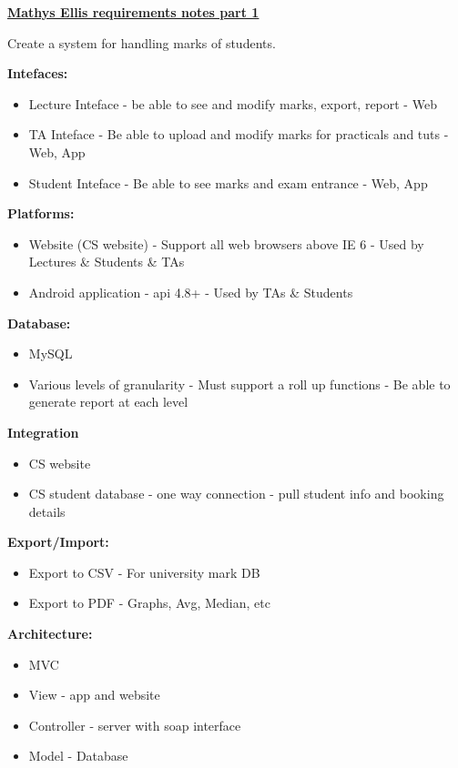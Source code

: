 \documentclass{article}
\begin{document}
\textbf{\underline{Mathys Ellis requirements notes part 1}}

Create a system for handling marks of students.

\textbf{Intefaces:}
\begin{itemize}
\item Lecture Inteface - be able to see and modify marks, export, report - Web
\item TA Inteface - Be able to upload and modify marks for practicals and tuts - Web, App
\item Student Inteface - Be able to see marks and exam entrance - Web, App
\end{itemize}

\textbf{Platforms:}
\begin{itemize}
\item Website (CS website) - Support all web browsers above IE 6 - Used by Lectures \& Students \& TAs
\item Android application - api 4.8+ - Used by TAs \& Students
\end{itemize}

\textbf{Database:}
\begin{itemize}
\item MySQL
\item Various levels of granularity - Must support a roll up functions - Be able to generate report at each level
\end{itemize}

\textbf{Integration}
\begin{itemize}
\item CS website
\item CS student database - one way connection - pull student info and booking details
\end{itemize}

\textbf{Export/Import:}
\begin{itemize}
\item Export to CSV - For university mark DB
\item Export to PDF - Graphs, Avg, Median, etc
\end{itemize}

\textbf{Architecture:}
\begin{itemize}
\item MVC
\item View - app and website
\item Controller - server with soap interface
\item Model - Database
\end{itemize}
\end{document}

